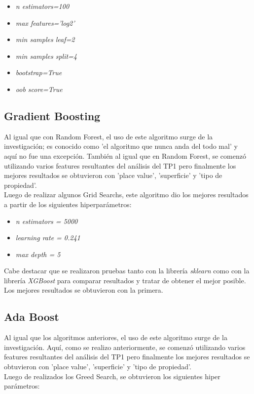 \documentclass[a4paper, 10pt]{article}
\newcommand\tab[1][0.5cm]{\hspace*{#1}}
\begin{document}
		\begin{itemize}
		
		\item \emph{n estimators=100}
			
		\item \emph{max features='log2'}

		\item \emph{min samples leaf=2}
		
		\item \emph{min samples split=4}
		
		\item \emph{bootstrap=True}
		
		\item \emph{oob score=True} 
			
		\end{itemize}
		
		\subsection{Gradient Boosting}
			Al igual que con Random Forest, el uso de este algoritmo surge de la investigación; es conocido como 'el algoritmo que nunca anda
			del todo mal' y aquí no fue una excepción. También al igual que en Random Forest, se comenzó utilizando varios features resultantes
			del análisis del TP1 pero finalmente los mejores resultados se obtuvieron con 'place value', 'superficie' y 'tipo de propiedad'. \\
			\tab Luego de realizar algunos Grid Searchs, este algoritmo dio los mejores resultados a partir de los siguientes hiperparámetros:
			\begin{itemize}
				\item \emph{n estimators = 5000}
				\item \emph{learning rate = 0.241}
				\item \emph{max depth = 5} 
			\end{itemize}
			\tab Cabe destacar que se realizaron pruebas tanto con la librería \emph{sklearn} como con la librería \emph{XGBoost} para comparar
			resultados y tratar de obtener el mejor posible. Los mejores resultados se obtuvieron con la primera.
		\subsection{Ada Boost}
		Al igual que los algoritmos anteriores, el uso de este algoritmo surge de la investigación. Aquí, como se realizo anteriormente, se comenzó utilizando varios features resultantes del análisis del TP1 pero finalmente los mejores resultados se obtuvieron con 'place value', 'superficie' y 'tipo de propiedad'.\\
		\tab Luego de realizados los Greed Search, se obtuvieron los siguientes hiper parámetros:
		
\end{document}
